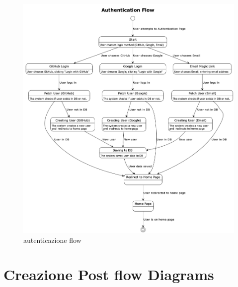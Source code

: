 \documentclass{article}
\begin{document}
    \begin{figure}[h]
        \lefting
        \includegraphics[width=1\textwidth]{authentication_flow}
        \caption{autenticazione flow}
        \label{fig:figure4}
    \end{figure}

    \clearpage
    \section{Creazione Post flow Diagrams}
    \label{sec:creazione_post_flow_diagrams}
\end{document}
